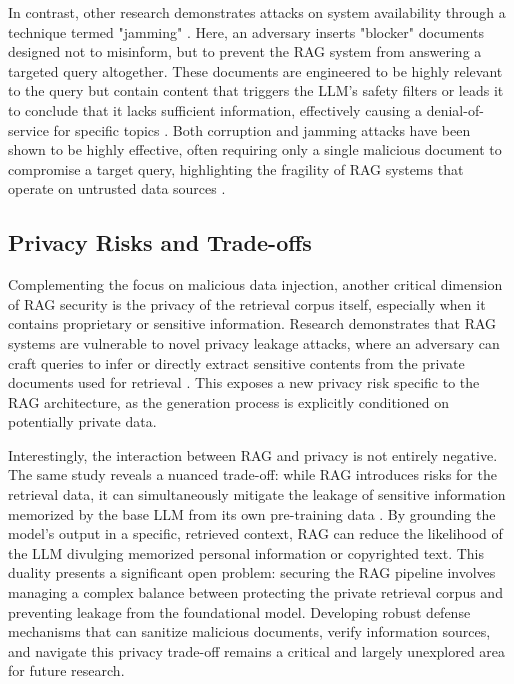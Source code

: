 \documentclass[11pt]{article}
\begin{document}
In contrast, other research demonstrates attacks on system availability through a technique termed "jamming" \cite{ref16}. Here, an adversary inserts "blocker" documents designed not to misinform, but to prevent the RAG system from answering a targeted query altogether. These documents are engineered to be highly relevant to the query but contain content that triggers the LLM's safety filters or leads it to conclude that it lacks sufficient information, effectively causing a denial-of-service for specific topics \cite{ref16}. Both corruption and jamming attacks have been shown to be highly effective, often requiring only a single malicious document to compromise a target query, highlighting the fragility of RAG systems that operate on untrusted data sources .

\subsection*{Privacy Risks and Trade-offs}

Complementing the focus on malicious data injection, another critical dimension of RAG security is the privacy of the retrieval corpus itself, especially when it contains proprietary or sensitive information. Research demonstrates that RAG systems are vulnerable to novel privacy leakage attacks, where an adversary can craft queries to infer or directly extract sensitive contents from the private documents used for retrieval \cite{ref17}. This exposes a new privacy risk specific to the RAG architecture, as the generation process is explicitly conditioned on potentially private data.

Interestingly, the interaction between RAG and privacy is not entirely negative. The same study reveals a nuanced trade-off: while RAG introduces risks for the retrieval data, it can simultaneously mitigate the leakage of sensitive information memorized by the base LLM from its own pre-training data \cite{ref17}. By grounding the model's output in a specific, retrieved context, RAG can reduce the likelihood of the LLM divulging memorized personal information or copyrighted text. This duality presents a significant open problem: securing the RAG pipeline involves managing a complex balance between protecting the private retrieval corpus and preventing leakage from the foundational model. Developing robust defense mechanisms that can sanitize malicious documents, verify information sources, and navigate this privacy trade-off remains a critical and largely unexplored area for future research.
\end{document}
